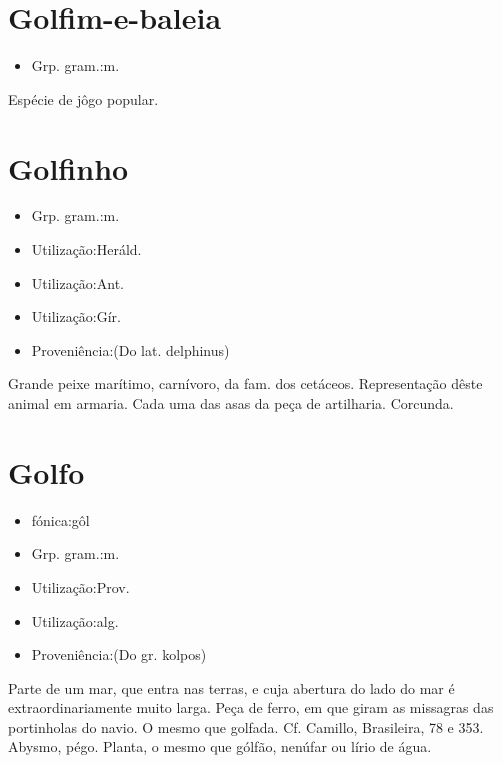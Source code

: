 \section{Golfim-e-baleia}
\begin{itemize}
\item {Grp. gram.:m.}
\end{itemize}
Espécie de jôgo popular.
\section{Golfinho}
\begin{itemize}
\item {Grp. gram.:m.}
\end{itemize}
\begin{itemize}
\item {Utilização:Heráld.}
\end{itemize}
\begin{itemize}
\item {Utilização:Ant.}
\end{itemize}
\begin{itemize}
\item {Utilização:Gír.}
\end{itemize}
\begin{itemize}
\item {Proveniência:(Do lat. \textunderscore delphinus\textunderscore )}
\end{itemize}
Grande peixe marítimo, carnívoro, da fam. dos cetáceos.
Representação dêste animal em armaria.
Cada uma das asas da peça de artilharia.
Corcunda.
\section{Golfo}
\begin{itemize}
\item {fónica:gôl}
\end{itemize}
\begin{itemize}
\item {Grp. gram.:m.}
\end{itemize}
\begin{itemize}
\item {Utilização:Prov.}
\end{itemize}
\begin{itemize}
\item {Utilização:alg.}
\end{itemize}
\begin{itemize}
\item {Proveniência:(Do gr. \textunderscore kolpos\textunderscore )}
\end{itemize}
Parte de um mar, que entra nas terras, e cuja abertura do lado do mar é extraordinariamente muito larga.
Peça de ferro, em que giram as missagras das portinholas do navio.
O mesmo que \textunderscore golfada\textunderscore . Cf. Camillo, \textunderscore Brasileira\textunderscore , 78 e 353.
Abysmo, pégo.
Planta, o mesmo que \textunderscore gólfão\textunderscore , nenúfar ou lírio de água.
